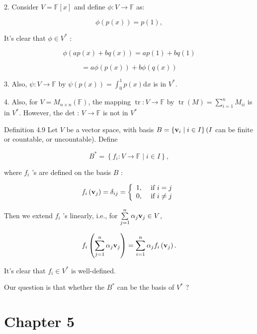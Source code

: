\documentclass[11pt]{article}
\begin{document}
2. Consider \(V = \mathbb{F}\left\lbrack  x\right\rbrack\) and define \(\phi  : V \rightarrow  \mathbb{F}\) as:

\[
\phi \left( {p\left( x\right) }\right)  = p\left( 1\right) ,
\]

It’s clear that \(\phi  \in  {V}^{ * }\) :

\[
\phi \left( {{ap}\left( x\right)  + {bq}\left( x\right) }\right)  = {ap}\left( 1\right)  + {bq}\left( 1\right)
\]

\[
= {a\phi }\left( {p\left( x\right) }\right)  + {b\phi }\left( {q\left( x\right) }\right)
\]

3. Also, \(\psi  : V \rightarrow  \mathbb{F}\) by \(\psi \left( {p\left( x\right) }\right)  = {\int }_{0}^1p\left( x\right) \mathrm{d}x\) is in \({V}^{ * }\).

4. Also, for \(V = {M}_{n \times  n}\left( \mathbb{F}\right)\), the mapping \(\operatorname{tr} : V \rightarrow  \mathbb{F}\) by \(\operatorname{tr}\left( M\right)  = \mathop{\sum }\limits_{{i = 1}}^n{M}_{ii}\) is in \({V}^{ * }\). However, the det : \(V \rightarrow  \mathbb{F}\) is not in \({V}^{ * }\)

Definition 4.9 Let \(V\) be a vector space, with basis \(B = \left\{  {{\bf v}_{i} \mid  i \in  I}\right\}  (I\) can be finite or countable, or uncountable). Define

\[
{B}^{ * } = \left\{  {{f}_{i} : V \rightarrow  \mathbb{F} \mid  i \in  I}\right\}  ,
\]

where \({f}_{i}\) ’s are defined on the basis \(B\) :

\[
{f}_{i}\left( {\bf v}_{j}\right)  = {\delta }_{ij} = \left\{  \begin{array}{ll} 1, & \text{ if }i = j \\  0, & \text{ if }i \neq  j \end{array}\right.
\]

Then we extend \({f}_{i}\) ’s linearly, i.e., for \(\mathop{\sum }\limits_{{j = 1}}^n\alpha_{j}{\bf v}_{j} \in  V\),

\[
{f}_{i}\left( {\mathop{\sum }\limits_{{j = 1}}^n\alpha_{j}{\bf v}_{j}}\right)  = \mathop{\sum }\limits_{{i = 1}}^n\alpha_{j}{f}_{i}\left( {\bf v}_{j}\right) .
\]

It’s clear that \({f}_{i} \in  {V}^{ * }\) is well-defined.

Our question is that whether the \({B}^{ * }\) can be the basis of \({V}^{ * }\) ?

\section*{Chapter 5}
\end{document}
